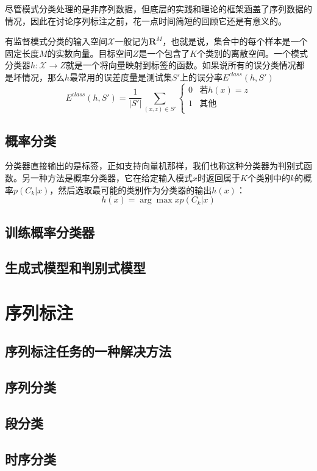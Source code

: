 尽管模式分类处理的是非序列数据，但底层的实践和理论的框架涵盖了序列数据的情况，因此在讨论序列标注之前，花一点时间简短的回顾它还是有意义的。

有监督模式分类的输入空间$\mathcal{X}$一般记为$\mathbf{R}^M$，也就是说，集合中的每个样本是一个固定长度$M$的实数向量。目标空间$Z$是一个包含了$K$个类别的离散空间。一个模式分类器$h:\mathcal{X}\rightarrow Z$就是一个将向量映射到标签的函数。如果说所有的误分类情况都是坏情况，那么$h$最常用的误差度量是测试集$S'$上的误分率$E^{class}(h, S')$
\begin{equation}
E^{class}(h, S') = \frac{1}{|S'|}\sum\limits_{(x,z)\in S'}\left\{
\begin{array}{ll}
0 & \mbox{若}h(x)=z \\
1 & \mbox{其他} \\
\end{array}\right.
\end{equation}
\subsection{概率分类}
分类器直接输出的是标签，正如支持向量机那样，我们也称这种分类器为判别式函数。另一种方法是概率分类器，它在给定输入模式$x$时返回属于$K$个类别中的$k$的概率$p(C_k|x)$，然后选取最可能的类别作为分类器的输出$h(x)$：
\begin{equation}
h(x) = \arg\max\limits{x}p(C_k|x)
\end{equation}

\subsection{训练概率分类器}
\subsection{生成式模型和判别式模型}
\section{序列标注\label{section:Sequence Labelling}}
\subsection{序列标注任务的一种解决方法}
\subsection{序列分类}
\subsection{段分类}
\subsection{时序分类}
